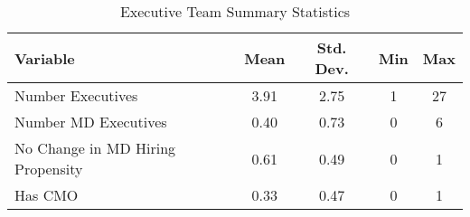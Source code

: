 \begin{table}[ht!]
\centering
\caption{\label{leader_sumstats}Executive Team Summary Statistics}
\centering
\begin{tabular}[t]{lcccc}
\toprule
Variable & Mean & Std. Dev. & Min & Max\\
\midrule
Number Executives & 3.91 & 2.75 & 1 & 27\\
Number MD Executives & 0.40 & 0.73 & 0 & 6\\
No Change in MD Hiring Propensity & 0.61 & 0.49 & 0 & 1\\
Has CMO & 0.33 & 0.47 & 0 & 1\\
\bottomrule
\end{tabular}
\end{table}
